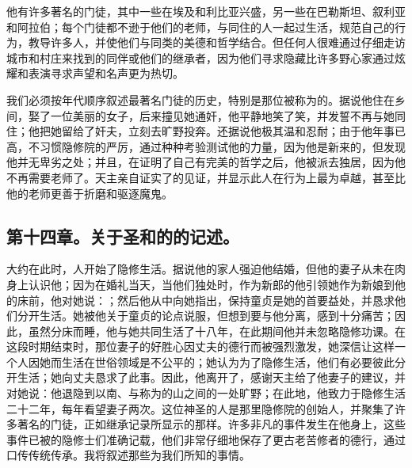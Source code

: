 他有许多著名的门徒，其中一些在埃及和利比亚兴盛，另一些在巴勒斯坦、叙利亚和阿拉伯；每个门徒都不逊于他们的老师，与同住的人一起过生活，规范自己的行为，教导许多人，并使他们与同类的美德和哲学结合。但任何人很难通过仔细走访城市和村庄来找到的同伴或他们的继承者，因为他们寻求隐藏比许多野心家通过炫耀和表演寻求声望和名声更为热切。\par

我们必须按年代顺序叙述最著名门徒的历史，特别是那位被称为的。据说他住在乡间，娶了一位美丽的女子，后来撞见她通奸，他平静地笑了笑，并发誓不再与她同住；他把她留给了奸夫，立刻去旷野投奔。还据说他极其温和忍耐；由于他年事已高，不习惯隐修院的严厉，通过种种考验测试他的力量，因为他是新来的，但发现他并无卑劣之处；并且，在证明了自己有完美的哲学之后，他被派去独居，因为他不再需要老师了。天主亲自证实了的见证，并显示此人在行为上最为卓越，甚至比他的老师更善于折磨和驱逐魔鬼。\par


\subsection{第十四章。关于圣和的的记述。}

大约在此时，人开始了隐修生活。据说他的家人强迫他结婚，但他的妻子从未在肉身上认识他；因为在婚礼当天，当他们独处时，作为新郎的他引领她作为新娘到他的床前，他对她说：；然后他从中向她指出，保持童贞是她的首要益处，并恳求他们分开生活。她被他关于童贞的论点说服，但想到要与他分离，感到十分痛苦；因此，虽然分床而睡，他与她共同生活了十八年，在此期间他并未忽略隐修功课。在这段时期结束时，那位妻子的好胜心因丈夫的德行而被强烈激发，她深信让这样一个人因她而生活在世俗领域是不公平的；她认为为了隐修生活，他们有必要彼此分开生活；她向丈夫恳求了此事。因此，他离开了，感谢天主给了他妻子的建议，并对她说：他退隐到以南、与称为的山之间的一处旷野；在此地，他致力于隐修生活二十二年，每年看望妻子两次。这位神圣的人是那里隐修院的创始人，并聚集了许多著名的门徒，正如继承记录所显示的那样。许多非凡的事件发生在他身上，这些事件已被的隐修士们准确记载，他们非常仔细地保存了更古老苦修者的德行，通过口传传统传承。我将叙述那些为我们所知的事情。\par

